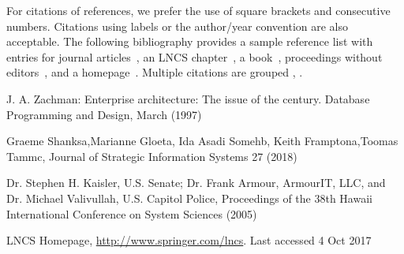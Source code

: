\documentclass[runningheads]{llncs}
\begin{document}
For citations of references, we prefer the use of square brackets
and consecutive numbers. Citations using labels or the author/year
convention are also acceptable. The following bibliography provides
a sample reference list with entries for journal
articles~\cite{ref_article1}, an LNCS chapter~\cite{ref_1}, a
book~\cite{ref_book1}, proceedings without editors~\cite{ref_proc1},
and a homepage~\cite{ref_url1}. Multiple citations are grouped
\cite{ref_article1,ref_lncs1,ref_book1},
\cite{ref_article1,ref_book1,ref_proc1,ref_url1}.
%
%
%
% 
% 
%
\begin{thebibliography}{8}
J. A. Zachman: Enterprise architecture: The issue of the century. Database Programming and Design, March (1997)

Graeme Shanksa,Marianne Gloeta, Ida Asadi Somehb, Keith Framptona,Toomas Tammc,  Journal of Strategic Information Systems 27 (2018)

Dr. Stephen H. Kaisler, U.S. Senate; Dr. Frank Armour, ArmourIT, LLC, and Dr. Michael Valivullah, U.S. Capitol Police, Proceedings of the 38th Hawaii International Conference on System Sciences (2005)

LNCS Homepage, \url{http://www.springer.com/lncs}. Last accessed 4
Oct 2017
\end{thebibliography}
\end{document}
